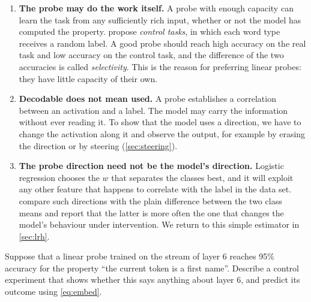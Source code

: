 \begin{enumerate}
\item \textbf{The probe may do the work itself.} A probe with enough capacity can learn the task from
any sufficiently rich input, whether or not the model has computed the property. \citet{hewitt2019designing}
propose \emph{control tasks}, in which each word type receives a random label. A good probe should reach high
accuracy on the real task and low accuracy on the control task, and the difference of the two accuracies is
called \emph{selectivity}. This is the reason for preferring linear probes: they have little capacity of their
own.
\item \textbf{Decodable does not mean used.} A probe establishes a correlation between an activation and a
label. The model may carry the information without ever reading it. To show that the model uses a direction,
we have to change the activation along it and observe the output, for example by erasing the direction
\citep{elazar2021amnesic} or by steering (\cref{sec:steering}).
\item \textbf{The probe direction need not be the model's direction.} Logistic regression chooses the $w$ that
separates the classes best, and it will exploit any other feature that happens to correlate with the label in
the data set. \citet{marks2024geometry} compare such directions with the plain difference between the two class
means and report that the latter is more often the one that changes the model's behaviour under intervention.
We return to this simple estimator in \cref{sec:lrh}.
\end{enumerate}

\begin{exercise}\label{ex:probecontrol}
Suppose that a linear probe trained on the stream of layer 6 reaches 95\% accuracy for the property ``the
current token is a first name''. Describe a control experiment that shows whether this says anything about layer
6, and predict its outcome using \eqref{eq:embed}.
\end{exercise}

